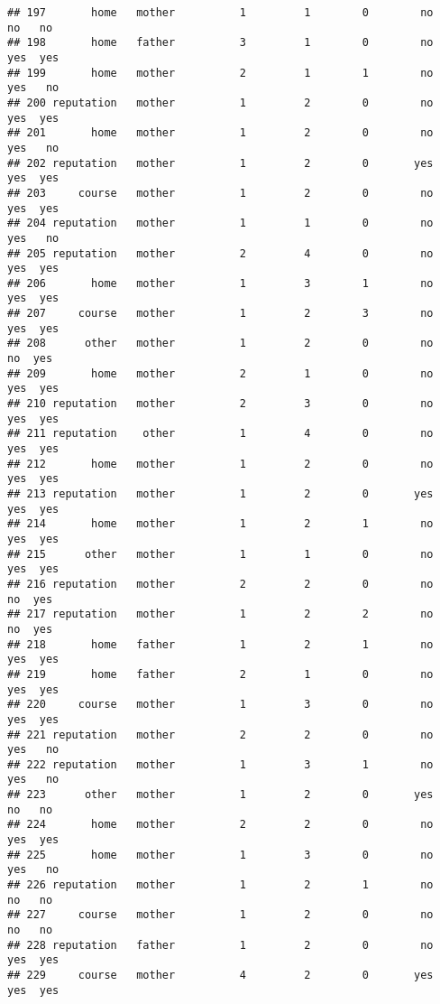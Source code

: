 \documentclass[
]{article}
\begin{document}
\begin{verbatim}
## 197       home   mother          1         1        0        no     no   no
## 198       home   father          3         1        0        no    yes  yes
## 199       home   mother          2         1        1        no    yes   no
## 200 reputation   mother          1         2        0        no    yes  yes
## 201       home   mother          1         2        0        no    yes   no
## 202 reputation   mother          1         2        0       yes    yes  yes
## 203     course   mother          1         2        0        no    yes  yes
## 204 reputation   mother          1         1        0        no    yes   no
## 205 reputation   mother          2         4        0        no    yes  yes
## 206       home   mother          1         3        1        no    yes  yes
## 207     course   mother          1         2        3        no    yes  yes
## 208      other   mother          1         2        0        no     no  yes
## 209       home   mother          2         1        0        no    yes  yes
## 210 reputation   mother          2         3        0        no    yes  yes
## 211 reputation    other          1         4        0        no    yes  yes
## 212       home   mother          1         2        0        no    yes  yes
## 213 reputation   mother          1         2        0       yes    yes  yes
## 214       home   mother          1         2        1        no    yes  yes
## 215      other   mother          1         1        0        no    yes  yes
## 216 reputation   mother          2         2        0        no     no  yes
## 217 reputation   mother          1         2        2        no     no  yes
## 218       home   father          1         2        1        no    yes  yes
## 219       home   father          2         1        0        no    yes  yes
## 220     course   mother          1         3        0        no    yes  yes
## 221 reputation   mother          2         2        0        no    yes   no
## 222 reputation   mother          1         3        1        no    yes   no
## 223      other   mother          1         2        0       yes     no   no
## 224       home   mother          2         2        0        no    yes  yes
## 225       home   mother          1         3        0        no    yes   no
## 226 reputation   mother          1         2        1        no     no   no
## 227     course   mother          1         2        0        no     no   no
## 228 reputation   father          1         2        0        no    yes  yes
## 229     course   mother          4         2        0       yes    yes  yes

\end{verbatim}
\end{document}
